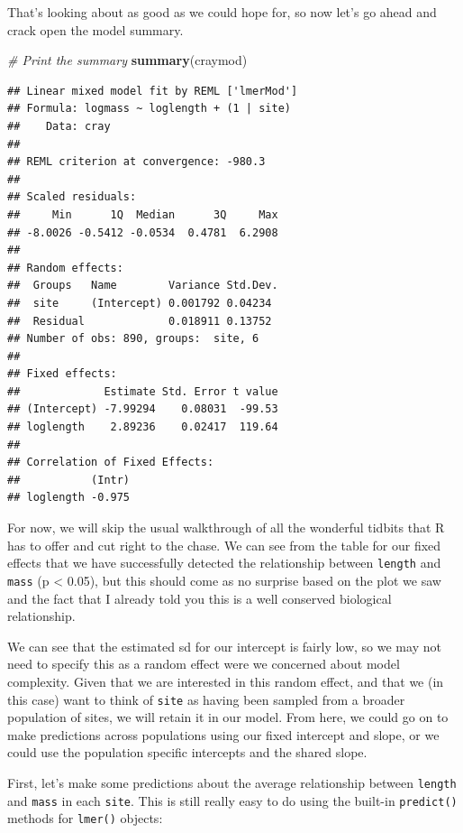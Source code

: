\documentclass[
]{book}
\newenvironment{Shaded}{\begin{snugshade}}{\end{snugshade}}
\newcommand{\CommentTok}[1]{\textcolor[rgb]{0.56,0.35,0.01}{\textit{#1}}}
\newcommand{\KeywordTok}[1]{\textcolor[rgb]{0.13,0.29,0.53}{\textbf{#1}}}
\newcommand{\NormalTok}[1]{#1}
\begin{document}
That's looking about as good as we could hope for, so now let's go ahead and crack open the model summary.

\begin{Shaded}
\begin{Highlighting}[]
\CommentTok{# Print the summary}
\KeywordTok{summary}\NormalTok{(craymod)}
\end{Highlighting}
\end{Shaded}

\begin{verbatim}
## Linear mixed model fit by REML ['lmerMod']
## Formula: logmass ~ loglength + (1 | site)
##    Data: cray
## 
## REML criterion at convergence: -980.3
## 
## Scaled residuals: 
##     Min      1Q  Median      3Q     Max 
## -8.0026 -0.5412 -0.0534  0.4781  6.2908 
## 
## Random effects:
##  Groups   Name        Variance Std.Dev.
##  site     (Intercept) 0.001792 0.04234 
##  Residual             0.018911 0.13752 
## Number of obs: 890, groups:  site, 6
## 
## Fixed effects:
##             Estimate Std. Error t value
## (Intercept) -7.99294    0.08031  -99.53
## loglength    2.89236    0.02417  119.64
## 
## Correlation of Fixed Effects:
##           (Intr)
## loglength -0.975
\end{verbatim}

For now, we will skip the usual walkthrough of all the wonderful tidbits that R has to offer and cut right to the chase. We can see from the table for our fixed effects that we have successfully detected the relationship between \texttt{length} and \texttt{mass} (p \textless{} 0.05), but this should come as no surprise based on the plot we saw and the fact that I already told you this is a well conserved biological relationship.

We can see that the estimated sd for our intercept is fairly low, so we may not need to specify this as a random effect were we concerned about model complexity. Given that we are interested in this random effect, and that we (in this case) want to think of \texttt{site} as having been sampled from a broader population of sites, we will retain it in our model. From here, we could go on to make predictions across populations using our fixed intercept and slope, or we could use the population specific intercepts and the shared slope.

First, let's make some predictions about the average relationship between \texttt{length} and \texttt{mass} in each \texttt{site}. This is still really easy to do using the built-in \texttt{predict()} methods for \texttt{lmer()} objects:
\end{document}
